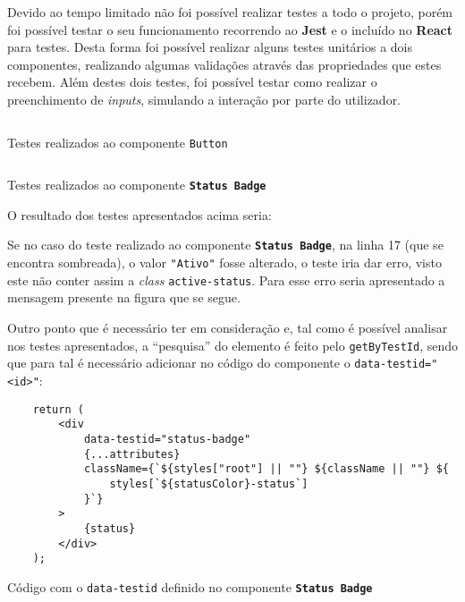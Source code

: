 \label{testsAttachments}

Devido ao tempo limitado não foi possível realizar testes a todo o projeto, porém foi possível testar o seu funcionamento recorrendo ao \textbf{Jest} e o \textit{} incluído no \textbf{React} para testes. Desta forma foi possível realizar alguns testes unitários a dois componentes, realizando algumas validações através das propriedades que estes recebem. Além destes dois testes, foi possível testar como realizar o preenchimento de \textit{inputs}, simulando a interação por parte do utilizador.

\begin{longlisting}
	\inputminted[]{jsx}{code/tests/button.test.tsx}
	\caption{Testes realizados ao componente \texttt{Button}}
\end{longlisting}

\begin{longlisting}
	\inputminted[highlightlines={17},highlightcolor=yellow!25]{jsx}{code/tests/status-badge.test.tsx}
	\caption{Testes realizados ao componente \textbf{\texttt{Status Badge}}}
\end{longlisting}

O resultado dos testes apresentados acima seria:


Se no caso do teste realizado ao componente \textbf{\texttt{Status Badge}}, na linha 17 (que se encontra sombreada), o valor \texttt{"Ativo"} fosse alterado, o teste iria dar erro, visto este não conter assim a \textit{class} \texttt{active-status}. Para esse erro seria apresentado a mensagem presente na figura que se segue.


Outro ponto que é necessário ter em consideração e, tal como é possível analisar nos testes apresentados, a ``pesquisa'' do elemento é feito pelo \texttt{getByTestId}, sendo que para tal é necessário adicionar no código do componente o \texttt{data-testid="<id>"}:

\begin{longlisting}
	\begin{verbatim}
	return (
		<div
			data-testid="status-badge"
			{...attributes}
			className={`${styles["root"] || ""} ${className || ""} ${
				styles[`${statusColor}-status`]
			}`}
		>
			{status}
		</div>
	);
	\end{verbatim}
	\caption{Código com o \texttt{data-testid} definido no componente \textbf{\texttt{Status Badge}}}
\end{longlisting}

